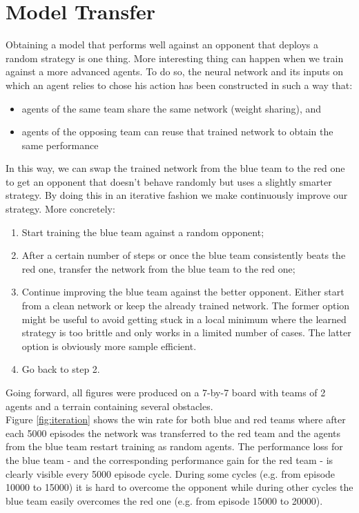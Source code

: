 \section{Model Transfer}
\label{sec:model_transfer}
Obtaining a model that performs well against an opponent that deploys a random strategy is one thing. More interesting thing can happen when we train against a more advanced agents. To do so, the neural network and its inputs on which an agent relies to chose his action has been constructed in such a way that:
\begin{itemize}
    \item agents of the same team share the same network (weight sharing), and
    \item agents of the opposing team can reuse that trained network to obtain the same performance 
\end{itemize}
In this way, we can swap the trained network from the blue team to the red one to get an opponent that doesn't behave randomly but uses a slightly smarter strategy. By doing this in an iterative fashion we make continuously improve our strategy. More concretely:
\begin{enumerate}
    \item Start training the blue team against a random opponent;
    \item After a certain number of steps or once the blue team consistently beats the red one, transfer the network from the blue team to the red one;
    \item Continue improving the blue team against the better opponent. Either start from a clean network or keep the already trained network. The former option might be useful to avoid getting stuck in a local minimum where the learned strategy is too brittle and only works in a limited number of cases. The latter option is obviously more sample efficient.
    \item Go back to step 2.
\end{enumerate}
Going forward, all figures were produced on a 7-by-7 board with teams of 2 agents and a terrain containing several obstacles.\\
Figure \ref{fig:iteration} shows the win rate for both blue and red teams where after each 5000 episodes the network was transferred to the red team and the agents from the blue team restart training as random agents. The performance loss for the blue team - and the corresponding performance gain for the red team - is clearly visible every 5000 episode cycle. During some cycles (e.g. from episode 10000 to 15000) it is hard to overcome the opponent while during other cycles the blue team easily overcomes the red one (e.g. from episode 15000 to 20000).\\
